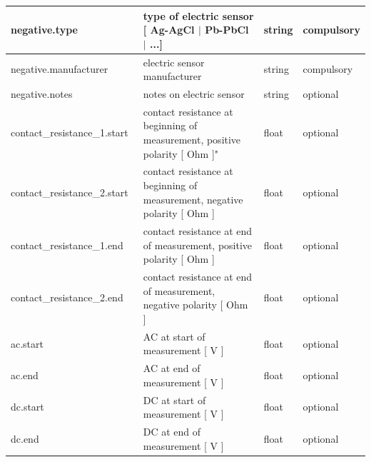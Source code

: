 \documentclass{article}
\begin{document}
\begin{table}[htb!]
\begin{tabular}{|l|p{3in}|l|l|}
        negative.type\ & type of electric sensor [ Ag-AgCl $|$ Pb-PbCl $|$ ...] & string & compulsory \\ \hline
        negative.manufacturer\ & electric sensor manufacturer & string & compulsory \\ \hline
        negative.notes\ & notes on electric sensor & string & optional \\ \hline
        contact\_resistance\_1.start\ & contact resistance at beginning of measurement, positive polarity [ Ohm ]" & float & optional \\ \hline
        contact\_resistance\_2.start\ & contact resistance at beginning of measurement, negative polarity [ Ohm ] & float & optional \\ \hline
        contact\_resistance\_1.end\ & contact resistance at end of measurement, positive polarity [ Ohm ] & float & optional \\ \hline
        contact\_resistance\_2.end\ & contact resistance at end of measurement, negative polarity [ Ohm ] & float & optional \\ \hline
        ac.start\ & AC at start of measurement [ V ] & float & optional \\ \hline
        ac.end\ & AC at end of measurement [ V ] & float & optional \\ \hline
        dc.start\ & DC at start of measurement [ V ] & float & optional \\ \hline
        dc.end\ & DC at end of measurement [ V ] & float & optional \\ \hline
        
    \end{tabular}
    \label{tab:electric01}
\end{table}    
\end{document}
